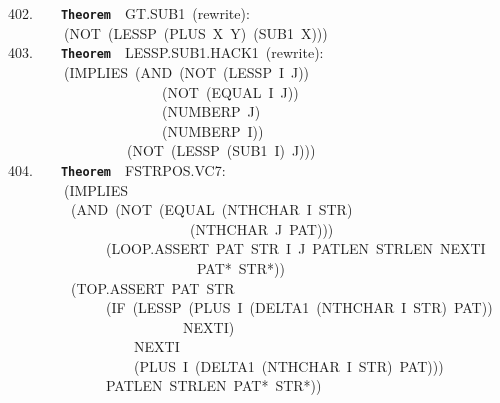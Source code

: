 \documentclass[11pt]{book}
\newenvironment{pubasis}{\begin{flushleft}\ttfamily\small}{\normalsize\rmfamily\end{flushleft}}
\newcommand{\axiomordefinition}[1]{\vspace{6pt}\texttt{\textbf{#1}}}
\begin{document}
\begin{pubasis}
402.~~~~\axiomordefinition{Theorem}~~GT.SUB1~(rewrite):\\
~~~~~~~~(NOT~(LESSP~(PLUS~X~Y)~(SUB1~X)))\\

403.~~~~\axiomordefinition{Theorem}~~LESSP.SUB1.HACK1~(rewrite):\\
~~~~~~~~(IMPLIES~(AND~(NOT~(LESSP~I~J))\\
~~~~~~~~~~~~~~~~~~~~~~(NOT~(EQUAL~I~J))\\
~~~~~~~~~~~~~~~~~~~~~~(NUMBERP~J)\\
~~~~~~~~~~~~~~~~~~~~~~(NUMBERP~I))\\
~~~~~~~~~~~~~~~~~(NOT~(LESSP~(SUB1~I)~J)))\\

404.~~~~\axiomordefinition{Theorem}~~FSTRPOS.VC7:\\
~~~~~~~~(IMPLIES\\
~~~~~~~~~(AND~(NOT~(EQUAL~(NTHCHAR~I~STR)\\
~~~~~~~~~~~~~~~~~~~~~~~~~~(NTHCHAR~J~PAT)))\\
~~~~~~~~~~~~~~(LOOP.ASSERT~PAT~STR~I~J~PATLEN~STRLEN~NEXTI\\
~~~~~~~~~~~~~~~~~~~~~~~~~~~PAT*~STR*))\\
~~~~~~~~~(TOP.ASSERT~PAT~STR\\
~~~~~~~~~~~~~~(IF~(LESSP~(PLUS~I~(DELTA1~(NTHCHAR~I~STR)~PAT))\\
~~~~~~~~~~~~~~~~~~~~~~~~~NEXTI)\\
~~~~~~~~~~~~~~~~~~NEXTI\\
~~~~~~~~~~~~~~~~~~(PLUS~I~(DELTA1~(NTHCHAR~I~STR)~PAT)))\\
~~~~~~~~~~~~~~PATLEN~STRLEN~PAT*~STR*))\\
\end{pubasis}
\end{document}
